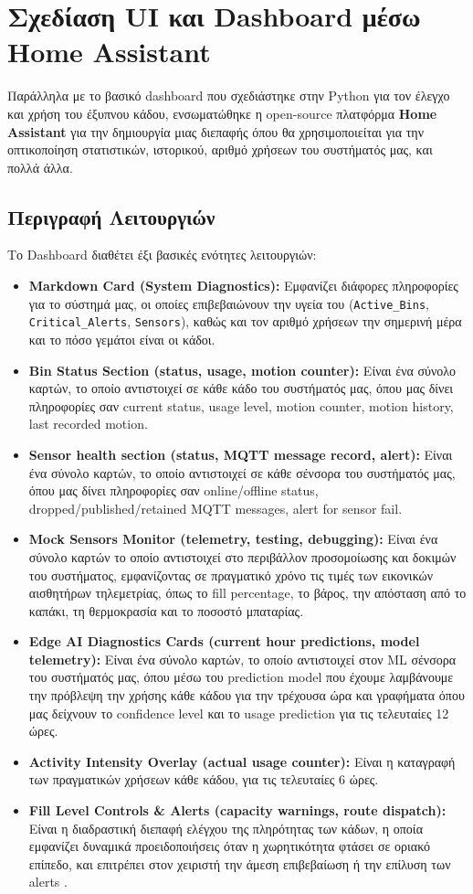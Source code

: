 \documentclass[acmsmall,screen,nonacm]{acmart}
\begin{document}
	\section{Σχεδίαση UI και Dashboard μέσω Home Assistant}
	Παράλληλα με το βασικό dashboard που σχεδιάστηκε στην Python για τον έλεγχο και χρήση του έξυπνου κάδου, ενσωματώθηκε η open-source πλατφόρμα \textbf{Home Assistant} για την δημιουργία μιας διεπαφής όπου θα χρησιμοποιείται για την οπτικοποίηση στατιστικών, ιστορικού, αριθμό χρήσεων του συστήματός μας, και πολλά άλλα.
	
	\subsection{Περιγραφή Λειτουργιών}
	Το Dashboard διαθέτει έξι βασικές ενότητες λειτουργιών:
	
	\begin{itemize}
		
		\item \textbf{Markdown Card (System Diagnostics):} Εμφανίζει διάφορες πληροφορίες για το σύστημά μας, οι οποίες επιβεβαιώνουν την υγεία του (\texttt{Active\_Bins}, \texttt{Critical\_Alerts}, \texttt{Sensors}), καθώς και τον αριθμό χρήσεων την σημερινή μέρα και το πόσο γεμάτοι είναι οι κάδοι.
		\item \textbf{Bin Status Section (status, usage, motion counter):} Είναι ένα σύνολο καρτών, το οποίο αντιστοιχεί σε κάθε κάδο του συστήματός μας, όπου μας δίνει πληροφορίες σαν current status, usage level, motion counter, motion history, last recorded motion.
		\item \textbf{Sensor health section (status, MQTT message record, alert):}  Είναι ένα σύνολο καρτών, το οποίο αντιστοιχεί σε κάθε σένσορα του συστήματός μας, όπου μας δίνει πληροφορίες σαν online/offline status, dropped/published/retained MQTT messages, alert for sensor fail.
		\item \textbf{Mock Sensors Monitor (telemetry, testing, debugging):} Είναι ένα σύνολο καρτών το οποίο αντιστοιχεί στο περιβάλλον προσομοίωσης και δοκιμών του συστήματος, εμφανίζοντας σε πραγματικό χρόνο τις τιμές των εικονικών αισθητήρων τηλεμετρίας, όπως το fill percentage, το βάρος, την απόσταση από το καπάκι, τη θερμοκρασία και το ποσοστό μπαταρίας.
		\item \textbf{Edge AI Diagnostics Cards (current hour predictions, model telemetry):} Είναι ένα σύνολο καρτών, το οποίο αντιστοιχεί στον ML σένσορα του συστήματός μας, όπου μέσω του prediction model που έχουμε λαμβάνουμε την πρόβλεψη την χρήσης κάθε κάδου για την τρέχουσα ώρα και γραφήματα όπου μας δείχνουν το confidence level και το usage prediction για τις τελευταίες 12 ώρες.
		\item \textbf{Activity Intensity Overlay (actual usage counter):} Είναι η καταγραφή των πραγματικών χρήσεων κάθε κάδου, για τις τελευταίες 6 ώρες.
		\item \textbf{Fill Level Controls \& Alerts (capacity warnings, route dispatch):} Είναι η διαδραστική διεπαφή ελέγχου της πληρότητας των κάδων, η οποία εμφανίζει δυναμικά προειδοποιήσεις όταν η χωρητικότητα φτάσει σε οριακό επίπεδο, και επιτρέπει στον χειριστή την άμεση επιβεβαίωση ή την επίλυση των alerts .
	\end{itemize}
	
\end{document}
